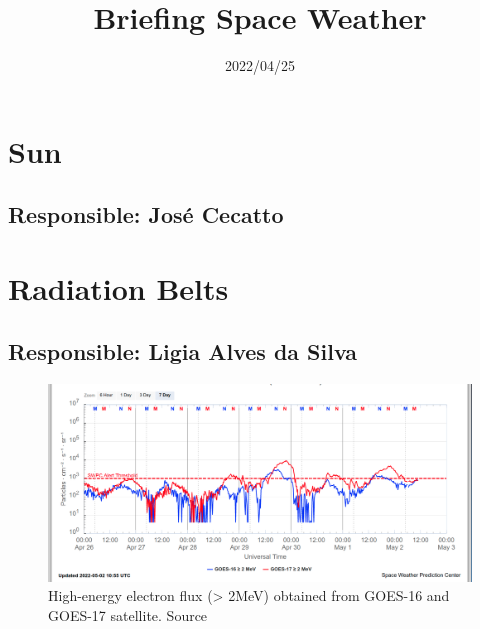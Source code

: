 \documentclass[11pt, oneside]{article}
\title{Briefing Space Weather}
\date{2022/04/25}
\begin{document}
\maketitle 

 \section{Sun} 
 \subsection{Responsible: José Cecatto}

\section{Radiation Belts} 
 \subsection{Responsible: Ligia Alves da Silva} 
 
\begin{figure}[H]
    
                        \centering
   
                             \includegraphics[width=14cm]{./figures//figureRadBelts_0.png}

                             \caption{ High-energy electron flux (> 2MeV) obtained from GOES-16 and GOES-17 satellite. Source}
                        \end{figure}
\end{document}
